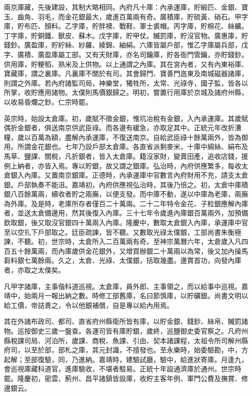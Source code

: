 兩京庫藏，先後建設，其制大略相同。內府凡十庫：內承運庫，貯緞匹、金銀、寶玉、齒角、羽毛，而金花銀最大，歲進百萬兩有奇。廣積庫，貯硫黃、硝石。甲字庫，貯布匹、顏料。乙字庫，貯胖襖、戰鞋、軍士裘帽。丙字庫，貯棉花、絲纊。丁字庫，貯銅鐵、獸皮、蘇木。戊字庫，貯甲仗。贓罰庫，貯沒官物。廣惠庫，貯錢鈔。廣盈庫，貯紵絲、紗羅、綾錦、紬絹。六庫皆屬戶部，惟乙字庫屬兵部，戊字、廣積、廣盈庫屬工部。又有天財庫，亦名司鑰庫，貯各衙門管鑰，亦貯錢鈔。供用庫，貯粳稻、熟米及上供物。以上通謂之內庫。其在宮內者，又有內東裕庫、寶藏庫，謂之裏庫。凡裏庫不關於有司。其會歸門、寶善門迤東及南城磁器諸庫，則謂之外庫。若內府諸監司局，神樂堂，犧牲所，太常、光祿寺，國子監，皆各以所掌，收貯應用諸物。太僕則馬價銀歸之。明初，嘗置行用庫於京城及諸府州縣，以收易昏爛之鈔。仁宗時罷。

英宗時，始設太倉庫。初，歲賦不徵金銀，惟坑冶稅有金銀，入內承運庫。其歲賦偶折金銀者，俱送南京供武臣祿。而各邊有緩急，亦取足其中。正統元年改折漕糧，歲以百萬為額，盡解內承運庫，不復送南京。自給武臣祿十餘萬兩外，皆為御用。所謂金花銀也。七年乃設戶部太倉庫。各直省派剩麥米，十庫中綿絲、絹布及馬草、鹽課、關稅，凡折銀者，皆入太倉庫。籍沒家財，變賣田產，追收店錢，援例上納者，亦皆入焉。專以貯銀，故又謂之銀庫。弘治時，內府供應繁多，每收太倉銀入內庫。又置南京銀庫。正德時，內承運庫中官數言內府財用不充，請支太倉銀。戶部執奏不能沮。嘉靖初，內府供應視弘治時，其後乃倍之。初，太倉中庫積銀八百餘萬兩，續收者貯之兩廡，以便支發。而中庫不動，遂以中庫為老庫，兩廡為外庫。及是時，老庫所存者僅百二十萬兩。二十二年特令金花、子粒銀應解內庫者，並送太倉備邊用，然其後復入內庫。三十七年令歲進內庫銀百萬兩外，加預備欽取銀，後又取沒官銀四十萬兩入內庫。隆慶中，數取太倉銀入內庫，承運庫中官至以空扎下戶部取之。廷臣疏諫，皆不聽。又數取光祿太僕銀，工部尚書朱衡極諫，不聽。初，世宗時，太倉所入二百萬兩有奇。至神宗萬曆六年，太倉歲入凡四百五十餘萬兩，而內庫歲供金花銀外，又增買辦銀二十萬兩以為常，後又加內操馬芻料銀七萬餘兩。久之，太倉、光祿、太僕銀，括取幾盡。邊賞首功，向發內庫者，亦取之太僕矣。

凡甲字諸庫，主事偕科道巡視。太倉庫，員外郎、主事領之，而以給事中巡視。嘉靖中，始兩月一報出納之數。時修工部舊庫，名曰節慎庫，以貯礦銀。尚書文明以給工價，帝詰責之，令以他銀補償，自是專以給內用焉。

其在外諸布政司、都司、直省府州縣衛所皆有庫，以貯金銀、錢鈔、絲帛、贓罰諸物。巡按御史三歲一盤查。各運司皆有庫貯銀，歲終，巡鹽御史委官察之。凡府州縣稅課司局、河泊所，歲課、商稅、魚課、引由、契本諸課程，太祖令所司解州縣府司，以至於部，部札之庫，其元封識，不擅發也。至永樂時，始委驗勘，中，方起解；至部復驗，同，乃進納。嘉靖時，建驗試廳，驗中，給進狀寄庫。月逢九，會巡視庫藏科道官，進庫驗收，不堪者駁易。正統十年設通濟庫於通州。世宗時罷。隆慶初，密雲、薊州、昌平諸鎮皆設庫，收貯主客年例、軍門公費及撫賞、修邊銀云。

